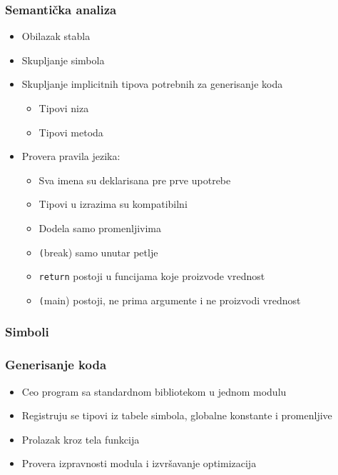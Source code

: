 \documentclass{beamer}
\newcommand{\code}[1]{\texttt{#1}}
\begin{document}

\begin{frame}
	\frametitle{Semantička analiza}
	\begin{itemize}
		\item Obilazak stabla
		\item Skupljanje simbola
		\item Skupljanje implicitnih tipova potrebnih za generisanje koda
		\begin{itemize}
			\item Tipovi niza
			\item Tipovi metoda
		\end{itemize}
		\item Provera pravila jezika:
		\begin{itemize}
		    \item Sva imena su deklarisana pre prve upotrebe
			\item Tipovi u izrazima su kompatibilni
			\item Dodela samo promenljivima
			\item \code(break) samo unutar petlje
			\item \code{return} postoji u funcijama koje proizvode vrednost
			\item \code(main) postoji, ne prima argumente i ne proizvodi vrednost
		\end{itemize}
	\end{itemize}
\end{frame}



\begin{frame}[c]
	\frametitle{Simboli}
	\begin{center}
	\scalebox{0.6}{
		
	}
	\end{center}
\end{frame}



\begin{frame}
	\frametitle{Generisanje koda}
	\begin{itemize}
	    \item Ceo program sa standardnom bibliotekom u jednom modulu
		\item Registruju se tipovi iz tabele simbola, globalne konstante i promenljive
		\item Prolazak kroz tela funkcija
		\item Provera izpravnosti modula i izvršavanje optimizacija
	\end{itemize}
\end{frame}
\end{document}
